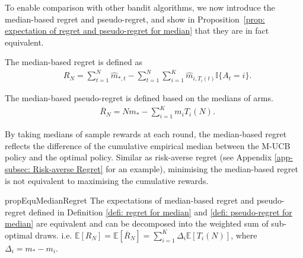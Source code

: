 To enable comparison with other bandit algorithms, we now
introduce the median-based regret and pseudo-regret,
and show in Proposition~\ref{prop: expectation of regret and pseudo-regret for median}
that they are in fact equivalent.



\begin{defi}
\label{defi: regret for median}
The median-based regret is defined as 
\begin{align}
    & R_N = \sum_{t=1}^N \hat{m}_{\ast, t} - \sum_{t = 1}^N \sum_{i = 1}^K \hat{m}_{i, T_i(t)} \mathbb{I}\{A_t = i\}.
\end{align}
\end{defi}

\begin{defi}
\label{defi: pseudo-regret for median}
The median-based pseudo-regret is defined based on the medians of arms.
    \begin{align}
    & \overline{R}_N = N m_\ast - \sum_{i=1}^K m_i T_i(N).
    \end{align}
\end{defi}

By taking medians of sample rewards at each round, the median-based regret reflects the difference of the cumulative empirical median between the M-UCB policy and the optimal policy. Similar as risk-averse regret (see Appendix \ref{app-subsec: Risk-averse Regret} for an example),
minimising the median-based regret is not equivalent to maximising the cumulative rewards.

\begin{restatable}{prop}{EquMedianRegret}
\label{prop: expectation of regret and pseudo-regret for median}
The expectations of median-based regret and pseudo-regret defined in Definition \ref{defi: regret for median} and \ref{defi: pseudo-regret for median} are equivalent and can be decomposed into the weighted sum of sub-optimal draws.
i.e. $\mathbb{E}[R_N] = \mathbb{E}[\overline{R}_{N}] = \sum_{i=1}^K \Delta_i \mathbb{E}[T_i(N)]$,
where $\Delta_i = m_\ast - m_i$.
\end{restatable}

